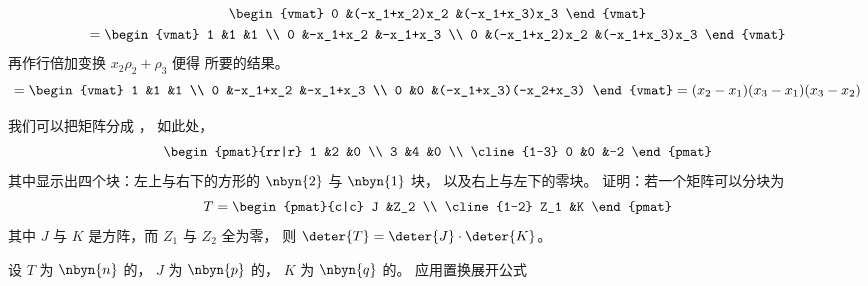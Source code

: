 \begin{exercises}
\begin{answer}
\begin{multline*}
\begin{vmat}
          0     &(-x_1+x_2)x_2 &(-x_1+x_3)x_3
        \end{vmat}                                           \\
        =
        \begin{vmat}
          1     &1             &1             \\
          0     &-x_1+x_2      &-x_1+x_3      \\
          0     &(-x_1+x_2)x_2 &(-x_1+x_3)x_3
        \end{vmat}
      \end{multline*}
      再作行倍加变换 $x_2\rho_2+\rho_3$ 便得
      所要的结果。
      \begin{equation*}
        =
        \begin{vmat}
          1     &1             &1                     \\
          0     &-x_1+x_2      &-x_1+x_3              \\
          0     &0             &(-x_1+x_3)(-x_2+x_3)
        \end{vmat}
        =(x_2-x_1)(x_3-x_1)(x_3-x_2)
      \end{equation*}
    \end{answer}
  \item
    我们可以把矩阵分成
    ， %
    如此处，
    \begin{equation*}
      \begin{pmat}{rr|r}
          1  &2   &0  \\
          3  &4   &0  \\  \cline{1-3}
          0  &0   &-2
       \end{pmat}
    \end{equation*}
    其中显示出四个块：左上与右下的方形的 $\nbyn{2}$ 与 $\nbyn{1}$ 块，
    以及右上与左下的零块。
    证明：若一个矩阵可以分块为
    \begin{equation*}
      T=
      \begin{pmat}{c|c}
          J   &Z_2  \\  \cline{1-2}
          Z_1 &K
       \end{pmat}
    \end{equation*}
    其中 $J$ 与 $K$ 是方阵，而 $Z_1$ 与 $Z_2$ 全为零，
    则 \( \deter{T}=\deter{J}\cdot\deter{K} \)。
    \begin{answer}
      设 \( T \) 为 \( \nbyn{n} \) 的，
      \( J \) 为 \( \nbyn{p} \) 的，
      \( K \) 为 \( \nbyn{q} \) 的。
      应用置换展开公式
      \begin{equation*}

\end{equation*}
\end{answer}
\end{exercises}
